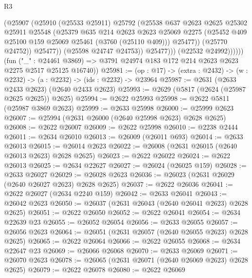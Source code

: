 \begin{lexlean}{R3}
\begin{coremodule}
                          (@25907
                            (@25910
                              (@25533 @25911)
                              @25792
                              (@25538
                                @637
                                @2623
                                @2625
                                @25302
                                @25911
                                @25548
                                (@25379
                                  @635
                                  @214
                                  @2623
                                  @2623
                                  @25069
                                  @2275
                                  (@25452 @409 @25100 @159 @25069 @25461 (@3760 (@25110 @409)))
                                  @25477))
                              (@25770 @24752))
                            @25477))
                        (@25598 @24747 @24753))
                      @25477)))
                (@22532 @24992))))))
      (fun ("_" : @24461 @3869) =>
      @3791 @24974 @183 @172 @214 @2623 @2623 @2275 @2517 @25125 @16740))
@25981 := (op : @17) -> (extra : @2432) -> (w : @2232) -> (a : @2232) -> (ids : @2232) -> @23964
@25987 := @2631 (@2633 @2433 @2623) (@2640 @2433 @2623)
@25993 := @2629 (@5817 (@2624 (@25987 @2625 @2625)) @2625)
@25994 := @2622 @25993
@25998 := @2622 @5811 (@25987 @3869 @2623)
@25999 := @2633 @25998
@26000 := @25999 @2623
@26007 := @25994 (@2631 @26000 (@2640 @25998 @2623) @2628 @2625)
@26008 := @2622 @26007
@26009 := @2622 @25998
@26010 := @2238 @2444
@26011 := @2634 @26010
@26013 := @26009 (@26011 @693)
@26014 := @2633 @26013
@26015 := @26014 @2623
@26022 := @26008 (@2631 @26015 (@2640 @26013 @2623) @2628 @2625)
@26023 := @2622 @26022
@26024 := @2622 @26013
@26025 := @2634 @22627
@26027 := @26024 (@26025 @159)
@26028 := @2633 @26027
@26029 := @26028 @2623
@26036 := @26023 (@2631 @26029 (@2640 @26027 @2623) @2628 @2625)
@26037 := @2622 @26036
@26041 := @2622 @26027 (@2634 @2240 @159)
@26042 := @2633 @26041
@26043 := @26042 @2623
@26050 := @26037 (@2631 @26043 (@2640 @26041 @2623) @2628 @2625)
@26051 := @2622 @26050
@26052 := @2622 @26041
@26054 := @2634 @22639 @23
@26055 := @26052 @26054
@26056 := @2633 @26055
@26057 := @26056 @2623
@26064 := @26051 (@2631 @26057 (@2640 @26055 @2623) @2628 @2625)
@26065 := @2622 @26064
@26066 := @2622 @26055
@26068 := @2634 @22647 @23
@26069 := @26066 @26068
@26070 := @2633 @26069
@26071 := @26070 @2623
@26078 := @26065 (@2631 @26071 (@2640 @26069 @2623) @2628 @2625)
@26079 := @2622 @26078
@26080 := @2622 @26069

\end{coremodule}
\end{lexlean}
